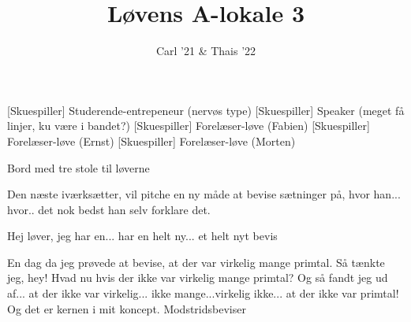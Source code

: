 \documentclass[a4paper,11pt]{article}
\title{Løvens A-lokale 3}
\author{Carl '21 \& Thais '22}
\begin{document}
\maketitle

\begin{roles}
[Skuespiller] Studerende-entrepeneur (nervøs type)
[Skuespiller] Speaker (meget få linjer, ku være i bandet?)
[Skuespiller] Forelæser-løve (Fabien)
[Skuespiller] Forelæser-løve (Ernst)
[Skuespiller] Forelæser-løve (Morten)
\end{roles}

\begin{props}
\item Bord med tre stole til løverne
\end{props}


\begin{sketch}
 Den næste iværksætter, vil pitche en ny måde at bevise sætninger på, hvor han... hvor.. det nok bedst han selv forklare det.

 Hej løver, jeg har en... har en helt ny... et helt nyt bevis


 En dag da jeg prøvede at bevise, at der var virkelig mange primtal. Så tænkte jeg, hey! Hvad nu hvis der ikke var virkelig mange primtal? Og så fandt jeg ud af... at der ikke var virkelig... ikke mange...virkelig ikke... at der ikke var primtal! Og det er kernen i mit koncept. Modstridsbeviser




\end{sketch}
\end{document}

